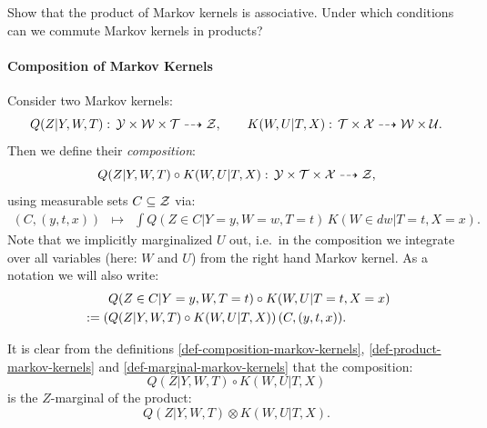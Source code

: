 \begin{Exc}
    Show that the product of Markov kernels is associative. 
    Under which conditions can we commute Markov kernels in products?
\end{Exc}

\paragraph{Composition of Markov Kernels}

\begin{Def}
        \label{def-composition-markov-kernels}
    Consider two Markov kernels:
    \[ Q(Z|Y,W,T):\, \mathcal{Y} \times \mathcal{W}\times \mathcal{T} \dashrightarrow \mathcal{Z},\qquad  K(W,U|T,X):\, 
    \mathcal{T} \times \mathcal{X} \dashrightarrow \mathcal{W}\times\mathcal{U}. \]
    Then we define their \emph{composition}:
    \[ Q(Z|Y,W,T) \circ K(W,U|T,X) :\, \mathcal{Y} \times  \mathcal{T} \times \mathcal{X} \dashrightarrow \mathcal{Z}, \]
    using  measurable sets $C \subseteq \mathcal{Z}$ via:
    \[\begin{array}{ccl}
    (C,(y,t,x))    &\mapsto & \displaystyle \int Q(Z \in C|Y=y,W=w,T=t) \, K(W \in dw|T=t,X=x).
    \end{array}\]
    Note that we implicitly marginalized $U$ out, i.e.\ in the composition we integrate over all variables (here: $W$ and $U$) 
    from the right hand Markov kernel.
    As a notation we will also write:
    \begin{align*} & \qquad Q(Z \in C|Y=y,W,T=t) \circ K(W,U|T=t,X=x) \\
    &:= \left ( Q(Z|Y,W,T) \circ K(W,U|T,X)\right ) (C,(y,t,x)).  \end{align*}
\end{Def}

\begin{Rem}
It is clear from the definitions \ref{def-composition-markov-kernels}, \ref{def-product-markov-kernels} and \ref{def-marginal-markov-kernels} that the composition:
    \[Q(Z|Y,W,T) \circ K(W,U|T,X)\]
    is the $Z$-marginal of the product:
    \[ Q(Z|Y,W,T) \otimes K(W,U|T,X).\]
\end{Rem}


